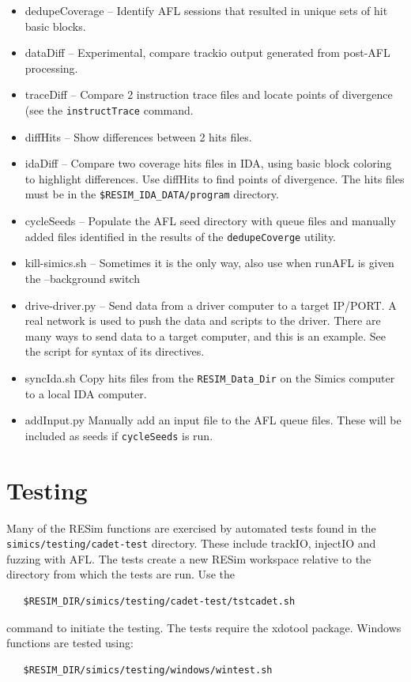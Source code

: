 \documentclass[titlepage]{article}
\begin{document}
\begin{itemize}
\item dedupeCoverage -- Identify AFL sessions that resulted in unique sets of hit basic blocks.
\item dataDiff -- Experimental, compare trackio output generated from post-AFL processing.
\item traceDiff -- Compare 2 instruction trace files and locate points of divergence (see the {\tt instructTrace} command.
\item diffHits -- Show differences between 2 hits files.
\item idaDiff -- Compare two coverage hits files in IDA, using basic block coloring to highlight differences.  Use diffHits to find points
of divergence.  The hits files must be in the {\tt \$RESIM\_IDA\_DATA/program} directory.
\item cycleSeeds -- Populate the AFL seed directory with queue files and manually added files identified in the results of the {\tt dedupeCoverge} utility.
\item kill-simics.sh -- Sometimes it is the only way, also use when runAFL is given the --background switch
\item drive-driver.py -- Send data from a driver computer to a target IP/PORT.  A real network is used to push the data and scripts
to the driver.  There are many ways to send data to a target computer, and this is an example.  See the script for syntax of its directives.
\item syncIda.sh Copy hits files from the {\tt RESIM\_Data\_Dir} on the Simics computer to a local IDA computer.
\item addInput.py Manually add an input file to the AFL queue files.  These will be included as seeds if {\tt cycleSeeds} is run.
\end{itemize}

\section{Testing}
Many of the RESim functions are exercised by automated tests found in the {\tt simics/testing/cadet-test} directory.
These include trackIO, injectIO and fuzzing with AFL.  The tests create a new RESim workspace relative to
the directory from which the tests are run.  Use the
\begin{verbatim}
   $RESIM_DIR/simics/testing/cadet-test/tstcadet.sh
\end{verbatim}
\noindent command to initiate the testing.  The tests require the xdotool package.
Windows functions are tested using:
\begin{verbatim}
   $RESIM_DIR/simics/testing/windows/wintest.sh
\end{verbatim}
\end{document}
